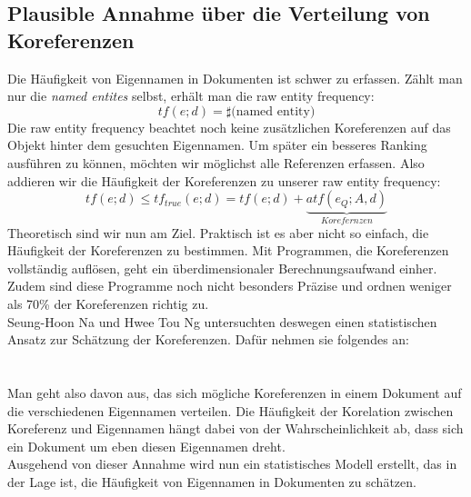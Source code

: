 \subsection{Plausible Annahme über die Verteilung von Koreferenzen}
Die Häufigkeit von Eigennamen in Dokumenten ist schwer zu erfassen. Zählt man nur die \textit{named entites} selbst, erhält man die raw entity frequency:
\[tf\left( e;d \right)=\sharp \text{(named entity)}\]
Die raw entity frequency beachtet  noch keine zusätzlichen Koreferenzen auf das Objekt hinter dem gesuchten Eigennamen. Um später ein besseres Ranking ausführen zu können, möchten wir möglichst alle Referenzen erfassen. Also addieren wir die Häufigkeit der Koreferenzen zu unserer raw entity frequency:
\[tf\left( e;d \right)\leq tf_{true}\left( e;d \right)=tf\left( e;d \right)+\underbrace{atf(e_Q;A,d)}_{Korefernzen}\]
Theoretisch sind wir nun am Ziel. Praktisch ist es aber nicht so einfach, die Häufigkeit der Koreferenzen zu bestimmen. Mit Programmen, die Koreferenzen vollständig auflösen, geht ein überdimensionaler Berechnungsaufwand einher. Zudem sind diese Programme noch nicht besonders Präzise und ordnen weniger als 70\% der Koreferenzen richtig zu.\cite{paper:Na}
\\
Seung-Hoon Na und Hwee Tou Ng untersuchten deswegen einen statistischen Ansatz zur Schätzung der Koreferenzen. Dafür nehmen sie folgendes an:
\\
\\
\\
Man geht also davon aus, das sich mögliche Koreferenzen in einem Dokument auf die verschiedenen Eigennamen verteilen. Die Häufigkeit der Korelation zwischen Koreferenz und Eigennamen hängt dabei von der Wahrscheinlichkeit ab, dass sich ein Dokument um eben diesen Eigennamen dreht.\\
Ausgehend von dieser Annahme wird nun ein statistisches Modell erstellt, das in der Lage ist, die Häufigkeit von Eigennamen in Dokumenten zu schätzen.
